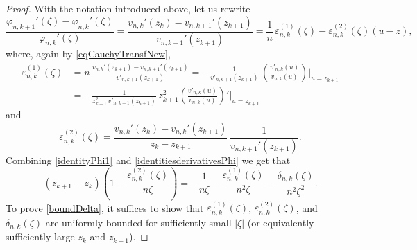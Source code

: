 \documentclass[reqno,11pt]{amsart}
\theoremstyle{plain}
\theoremstyle{definition}
\theoremstyle{remark}
\numberwithin{equation}{section}
\numberwithin{equation}{section}
\begin{document}
\begin{proof}
With the notation introduced above, let us rewrite
\begin{equation} \label{identitiesderivativesPhi}
\frac{\varphi_{n, k+1}'\left( \zeta \right)-\varphi_{n, k}'(\zeta)}{\varphi_{n, k}'(\zeta)  }  = \frac{ v_{n, k}' \left( z_k \right) - v_{n, k+1}' \left( z_{k+1} \right) }{  v_{n,k+1}'\left( z_{k+1} \right)}  =  \frac{1}{n}\, \varepsilon_{n,k}^{(1)} (\zeta) - \varepsilon_{n,k}^{(2)} (\zeta)(u-z) ,
\end{equation}
where, again by \eqref{eqCauchyTransfNew}, 
\begin{equation}
\begin{split}
\varepsilon_{n,k}^{(1)} (\zeta) & = n \, \frac{  v_{n, k}'\left( z_{k+1}\right)-  v_{n, k+1}'(z_{k+1})}{ v'_{n, k+1}(z_{k+1}) } =- \frac{1}{   v'_{n, k+1}(z_{k+1}) } \,  \left(  \frac{  v'_{n,k}(u)}{  v_{n,k}(u)}\right)\bigg|_{u=z_{k+1}} \\
& =-  \frac{1}{z_{k+1}^2 \,  v'_{n, k+1}(z_{k+1}) } \, z_{k+1}^2 \left(  \frac{  v'_{n,k}(u)}{  v_{n,k}(u)}\right)'\bigg|_{u=z_{k+1}}
\label{expressionepsilonMod}
\end{split}
\end{equation}
and
$$
\varepsilon_{n,k}^{(2)} (\zeta) = \frac{ v_{n, k}' \left( z_k \right)- v_{n,k}'\left( z_{k+1} \right)}{    z_k-z_{k+1} } \, \frac{ 1}{  v_{n,k+1}'\left( z_{k+1} \right)  }.
$$
Combining \eqref{identityPhi1} and \eqref{identitiesderivativesPhi} we get that 
\begin{equation}
    \label{intermediate}
    \left(z_{k+1}-z_k\right) \left(1- \frac{\varepsilon_{n,k}^{(2)} (\zeta)}{n \zeta} \right) = -\frac{1}{n \zeta} -\frac{\varepsilon_{n,k}^{(1)} (\zeta)}{n^2 \zeta}  -\frac{\delta_{n, k}(\zeta)}{n^2 \zeta^2}.
\end{equation}
To prove \eqref{boundDelta}, it suffices to show that $\varepsilon_{n,k}^{(1)} (\zeta)$, $\varepsilon_{n,k}^{(2)} (\zeta)$, and $\delta_{n,k} (\zeta)$ are uniformly bounded for sufficiently small $|\zeta|$ (or equivalently sufficiently large $z_k$ and $z_{k+1}$). 


\end{proof}
\end{document}
